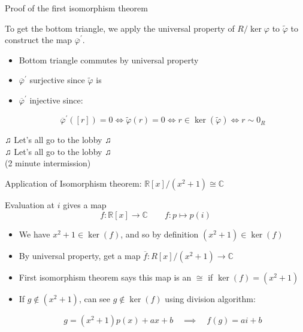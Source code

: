 \documentclass{beamer}
\newcommand{\C}{\mathbb{C}}
\newcommand{\R}{\mathbb{R}}
\begin{document}
\begin{frame}[fragile]{Proof of the first isomorphism theorem}
\begin{center}
\end{center}
To get the bottom triangle, we apply the universal property of $R/\ker{\varphi}$ to $\tilde{\varphi}$ to construct the map $\overline{\varphi}^\prime$.

\begin{itemize}
\item Bottom triangle commutes by universal property
\item $\overline{\varphi}^\prime$ surjective since $\tilde{\varphi}$ is
\item $\overline{\varphi}^\prime$ injective since:
 

$$\overline{\varphi}^\prime([r])=0\iff \tilde{\varphi}(r)=0\iff r\in \ker(\tilde{\varphi})\iff r\sim 0_R$$

\end{itemize}


\end{frame}


\begin{frame}[plain,c]

\begin{center}

\Huge

$\twonotes$ Let's all go to the lobby $\twonotes$ \\ $\twonotes$ Let's all go to the lobby $\twonotes$ \\
(2 minute intermission)
\end{center}

\end{frame}

\begin{frame}{Application of Isomorphism theorem: $\R[x]/(x^2+1)\cong\C$}

Evaluation at $i$ gives a map 
$$f:\R[x]\to \C\quad \quad f:p\mapsto p(i)$$
\begin{itemize}
\item We have $x^2+1\in\ker(f)$, and so by definition $(x^2+1)\in\ker(f)$
\item By universal property, get a map $\overline{f}:R[x]/(x^2+1)\to\C$
\item First isomorphism theorem says this map is an $\cong$ if $\ker(f)=(x^2+1)$
\item If $g\notin (x^2+1)$, can see $g\notin \ker(f)$ using division algorithm:

$$g=(x^2+1)p(x)+ax+b\quad \implies\quad f(g)=ai+b $$


\end{itemize}


\end{frame}
\end{document}
